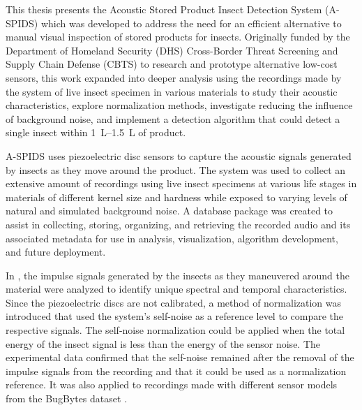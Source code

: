 
This thesis presents the  Acoustic Stored Product Insect Detection System (A-SPIDS) which was developed to address the need for an efficient alternative to manual visual inspection of stored products for insects. Originally funded by the Department of Homeland Security (DHS) Cross-Border Threat Screening and Supply Chain Defense (CBTS) to research and prototype alternative low-cost sensors, this work expanded into deeper analysis using the recordings made by the system of live insect specimen in various materials to study their acoustic characteristics, explore normalization methods, investigate reducing the influence of background noise, and implement a detection algorithm that could detect a single insect within \SIrange{1}{1.5}{\liter} of product. 

A-SPIDS uses piezoelectric disc sensors to capture the acoustic signals generated by insects as they move around the product. The system was used to collect an extensive amount of recordings using live insect specimens at various life stages in materials of different kernel size and hardness while exposed to varying levels of natural and simulated background noise. A database package was created to assist in collecting, storing, organizing, and retrieving the recorded audio and its associated metadata for use in analysis, visualization, algorithm development, and future deployment.

In , the impulse signals generated by the insects as they maneuvered around the material were analyzed to identify unique spectral and temporal characteristics. Since the piezoelectric discs are not calibrated, a method of normalization was introduced that used the system's self-noise as a reference level to compare the respective signals. The self-noise normalization could be applied when the total energy of the insect signal is less than the energy of the sensor noise. The experimental data confirmed that the self-noise remained after the removal of the impulse signals from the recording and that it could be used as a normalization reference. It was also applied to recordings made with different sensor models from the BugBytes dataset \cite{mankinBugBytesSound2019,kadyrovVibroAcousticSignaturesVarious2024}.

